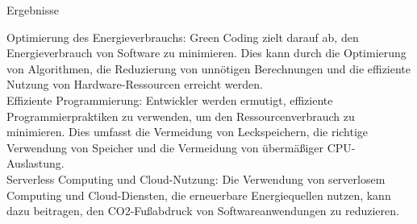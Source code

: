 \documentclass[10pt,aspectratio=169]{beamer}
\begin{document}
\begin{frame}{Ergebnisse}
\begin{minipage}{0.94\linewidth}
\begin{framed}
        Optimierung des Energieverbrauchs: Green Coding zielt darauf ab, den Energieverbrauch von Software zu minimieren. Dies kann durch die Optimierung von Algorithmen, die Reduzierung von unnötigen Berechnungen und die effiziente Nutzung von Hardware-Ressourcen erreicht werden.\\[2mm]
        Effiziente Programmierung: Entwickler werden ermutigt, effiziente Programmierpraktiken zu verwenden, um den Ressourcenverbrauch zu minimieren. Dies umfasst die Vermeidung von Leckspeichern, die richtige Verwendung von Speicher und die Vermeidung von übermäßiger CPU-Auslastung.\\[2mm]
        Serverless Computing und Cloud-Nutzung: Die Verwendung von serverlosem Computing und Cloud-Diensten, die erneuerbare Energiequellen nutzen, kann dazu beitragen, den CO2-Fußabdruck von Softwareanwendungen zu reduzieren.
    \end{framed}
    \end{minipage}
\end{frame}
\end{document}
